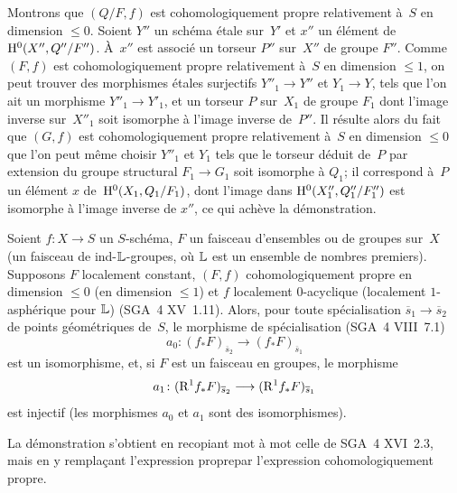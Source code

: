 Montrons que $(Q/F,f)$ est cohomologiquement propre relativement \`a~$S$ en dimension $\leqslant 0$. Soient $Y''$ un sch\'ema \'etale
sur~$Y'$ et $x''$ un \'el\'ement de~$\mathrm{H}^0(X'',Q''/F'')$. \`A~$x''$
est associ\'e un torseur $P''$ sur~$X''$ de groupe $F''$. Comme
$(F,f)$ est cohomologiquement propre relativement \`a~$S$ en
dimension $\leqslant 1$, on peut trouver des morphismes \'etales
surjectifs $Y''_1 \to Y''$ et $Y_1 \to Y$, tels que l'on ait un
morphisme $Y''_1 \to Y'_1$, et un torseur $P$ sur~$X_1$ de groupe
$F_1$ dont l'image inverse sur~$X''_1$ soit isomorphe \`a l'image
inverse de~$P''$. Il r\'esulte alors du fait que $(G,f)$ est
cohomologiquement propre relativement \`a~$S$ en dimension
$\leqslant 0$ que l'on peut m\^eme choisir $Y''_1$ et $Y_1$ tels que
le torseur d\'eduit de~$P$ par extension du groupe structural $F_1
\to G_1$ soit isomorphe \`a $Q_1$; il correspond \`a~$P$ un
\'el\'ement $x$ de~$\mathrm{H}^0(X_1,Q_1/F_1)$, dont l'image dans
$\mathrm{H}^0(X''_1,Q''_1/F''_1)$ est isomorphe \`a l'image inverse de
$x''$, ce qui ach\`eve la d\'emonstration.

\begin{proposition}
\label{XIII.1.14}
Soient $f \colon X \to S$ un $S$-sch\'ema, $F$ un faisceau
d'ensembles ou de groupes sur~$X$ (\resp un faisceau de
ind-$\mathbb{L}$-groupes, o\`u $\mathbb{L}$ est un ensemble de nombres
premiers). Supposons $F$ localement constant, $(F,f)$
cohomologiquement propre en dimension $\leqslant 0$ (\resp en
dimension $\leqslant 1$) et $f$ localement $0$-acyclique
(\resp localement $1$-asph\'erique pour $\mathbb{L}$) \textup{(SGA~4 XV~1.11)}.
Alors, pour toute sp\'ecialisation $\overline{s}_1 \to
\overline{s}_2$ de points g\'eom\'etriques de~$S$, le morphisme de
sp\'ecialisation \textup{(SGA~4 VIII~7.1)}
$$
a_0 \colon (f_* F)_{\overline{s}_2} \to (f_*
F)_{\overline{s}_1}
$$
est un isomorphisme, et, si $F$ est un faisceau en groupes, le
morphisme
$$
a_1 \colon (\R^1 f_* F)_{\overline{s}_2} \to (\R^1 f_*
F)_{\overline{s}_1}
$$
est injectif (\resp les morphismes $a_0$ et $a_1$ sont des
isomorphismes).
\end{proposition}

La
d\'emonstration s'obtient en recopiant mot \`a mot celle de SGA~4
XVI~2.3, mais en y rempla\c cant l'expression \og propre\fg par
l'expression \og cohomologiquement propre\fg.

\enlargethispage{.5cm}

